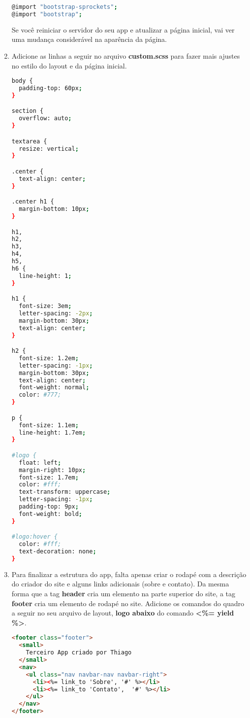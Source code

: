 \documentclass[a4paper,12pt]{article}
\begin{document}
\begin{enumerate}
  \begin{lstlisting}[language=Bash, title={app/assets/stylesheets/custom.scss}]
@import "bootstrap-sprockets";
@import "bootstrap";
  \end{lstlisting}

  Se você reiniciar o servidor do seu app e atualizar a página inicial, vai ver uma mudança considerável na aparência da página.

  \item Adicione as linhas a seguir no arquivo \textbf{custom.scss} para fazer mais ajustes no estilo do layout e da página inicial.

  \begin{lstlisting}[language=Bash, title={app/assets/stylesheets/custom.scss}]
body {
  padding-top: 60px;
}

section {
  overflow: auto;
}

textarea {
  resize: vertical;
}

.center {
  text-align: center;
}

.center h1 {
  margin-bottom: 10px;
}

h1,
h2,
h3,
h4,
h5,
h6 {
  line-height: 1;
}

h1 {
  font-size: 3em;
  letter-spacing: -2px;
  margin-bottom: 30px;
  text-align: center;
}

h2 {
  font-size: 1.2em;
  letter-spacing: -1px;
  margin-bottom: 30px;
  text-align: center;
  font-weight: normal;
  color: #777;
}

p {
  font-size: 1.1em;
  line-height: 1.7em;
}

#logo {
  float: left;
  margin-right: 10px;
  font-size: 1.7em;
  color: #fff;
  text-transform: uppercase;
  letter-spacing: -1px;
  padding-top: 9px;
  font-weight: bold;
}

#logo:hover {
  color: #fff;
  text-decoration: none;
}
  \end{lstlisting}

  \item Para finalizar a estrutura do app, falta apenas criar o rodapé com a descrição do criador do site e alguns links adicionais (sobre e contato). Da mesma forma que a tag \textbf{header} cria um elemento na parte superior do site, a tag \textbf{footer} cria um elemento de rodapé no site. Adicione os comandos do quadro a seguir no seu arquivo de layout, \textbf{logo abaixo} do comando \textbf{<\%= yield \%>}.

  \begin{lstlisting}[language=html, title={app/views/layouts/application.html.erb}]
<footer class="footer">
  <small>
    Terceiro App criado por Thiago
  </small>
  <nav>
    <ul class="nav navbar-nav navbar-right">
      <li><%= link_to 'Sobre', '#' %></li>
      <li><%= link_to 'Contato',  '#' %></li>
    </ul>
  </nav>
</footer>
  \end{lstlisting}


\end{enumerate}
\end{document}
